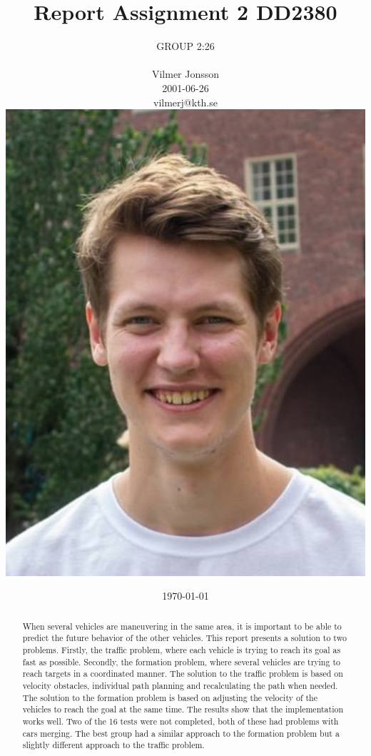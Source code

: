 \documentclass[a4paper,12pt]{article}
\title{Report Assignment 2 DD2380}
\author{\hspace*{-0.5cm}
GROUP 2:26\\
\begin{tabular}{cccc}
Vilmer Jonsson \\
2001-06-26  \\
vilmerj@kth.se \\
\includegraphics[width=0.13\linewidth]{Vilmer_Jonsson.jpg}
\end{tabular}}
\date{\today}
\begin{document}
\maketitle
\thispagestyle{fancy}

\begin{abstract}

When several vehicles are maneuvering in the same area, it is important to be able to predict the future behavior of the other vehicles. This report presents a solution to two problems. Firstly, the traffic problem, where each vehicle is trying to reach its goal as fast as possible. Secondly, the formation problem, where several vehicles are trying to reach targets in a coordinated manner. The solution to the traffic problem is based on velocity obstacles, individual path planning and recalculating the path when needed. The solution to the formation problem is based on adjusting the velocity of the vehicles to reach the goal at the same time. The results show that the implementation works well. Two of the 16 tests were not completed, both of these had problems with cars merging. The best group had a similar approach to the formation problem but a slightly different approach to the traffic problem.



\end{abstract}


\clearpage
\end{document}
